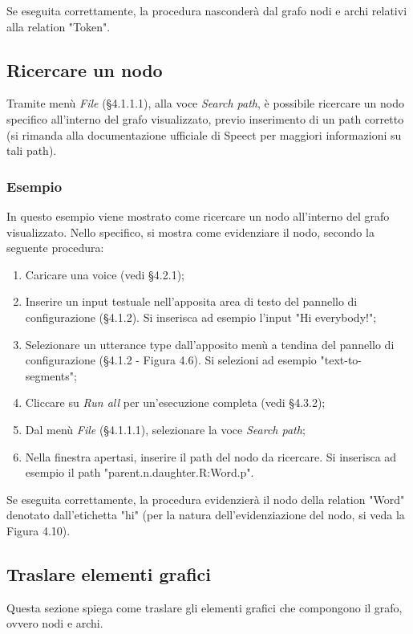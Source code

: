 \documentclass[openany,12pt,a4paper]{report}
\begin{document}
	\noindent Se eseguita correttamente, la procedura nasconderà dal grafo nodi e archi relativi alla relation "Token".
	
	\subsection{Ricercare un nodo}
	Tramite menù \textit{File} (§4.1.1.1), alla voce \textit{Search path}, è possibile ricercare un nodo specifico all'interno del grafo visualizzato, previo inserimento di un path corretto (si rimanda alla documentazione ufficiale di Speect per maggiori informazioni su tali path).
	
	\subsubsection*{Esempio}
	
	In questo esempio viene mostrato come ricercare un nodo all'interno del grafo visualizzato. Nello specifico, si mostra come evidenziare il nodo, secondo la seguente procedura:
	
	\begin{enumerate}
		\item Caricare una voice (vedi §4.2.1);
		\item Inserire un input testuale nell'apposita area di testo del pannello di configurazione (§4.1.2). Si inserisca ad esempio l'input "Hi everybody!";
		\item Selezionare un utterance type dall'apposito menù a tendina del pannello di configurazione (§4.1.2 - Figura 4.6). Si selezioni ad esempio "text-to-segments";
		\item Cliccare su \textit{Run all} per un'esecuzione completa (vedi §4.3.2);
		\item Dal menù \textit{File} (§4.1.1.1), selezionare la voce \textit{Search path};
		\item Nella finestra apertasi, inserire il path del nodo da ricercare. Si inserisca ad esempio il path "parent.n.daughter.R:Word.p".
	\end{enumerate}
	
	\noindent Se eseguita correttamente, la procedura evidenzierà il nodo della relation "Word" denotato dall'etichetta "hi" (per la natura dell'evidenziazione del nodo, si veda la Figura 4.10).

	\subsection{Traslare elementi grafici}
	Questa sezione spiega come traslare gli elementi grafici che compongono il grafo, ovvero nodi e archi.
	
\end{document}
